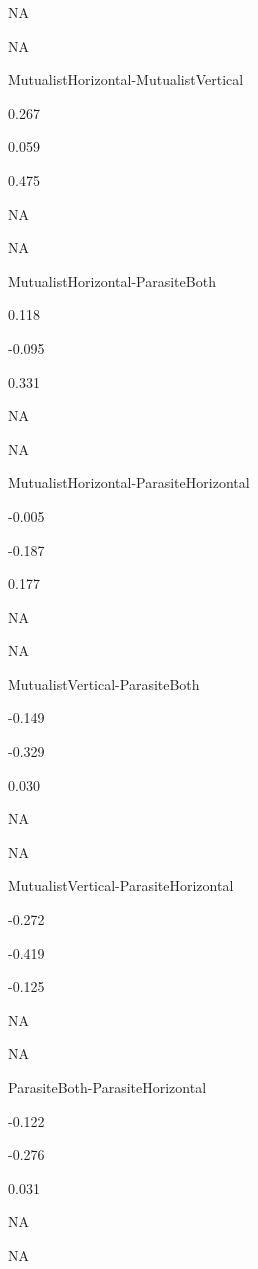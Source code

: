 \documentclass[
]{article}
\begin{document}
NA

NA

MutualistHorizontal-MutualistVertical

0.267

0.059

0.475

NA

NA

MutualistHorizontal-ParasiteBoth

0.118

-0.095

0.331

NA

NA

MutualistHorizontal-ParasiteHorizontal

-0.005

-0.187

0.177

NA

NA

MutualistVertical-ParasiteBoth

-0.149

-0.329

0.030

NA

NA

MutualistVertical-ParasiteHorizontal

-0.272

-0.419

-0.125

NA

NA

ParasiteBoth-ParasiteHorizontal

-0.122

-0.276

0.031

NA

NA
\end{document}
